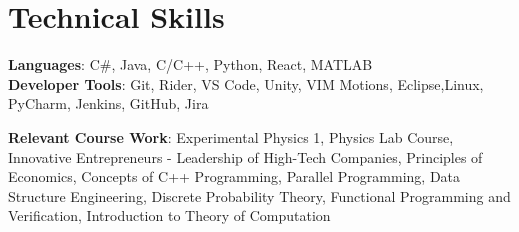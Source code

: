 \section{Technical Skills}
 \begin{itemize}[leftmargin=0.15in, label={}]
    \small{\item{
     \textbf{Languages}{: C\#, Java, C/C++, Python, React, MATLAB} \\
     \textbf{Developer Tools}{: Git, Rider, VS Code, Unity, VIM Motions, Eclipse,Linux, PyCharm, Jenkins, GitHub, Jira} \\
    }}
    \textbf{Relevant Course Work}{: Experimental Physics 1, Physics Lab Course, Innovative Entrepreneurs - Leadership of High-Tech Companies, Principles of Economics, Concepts of C++ Programming, Parallel Programming, Data Structure Engineering, Discrete Probability Theory, Functional Programming and Verification, Introduction to Theory of Computation} 
 \end{itemize}
